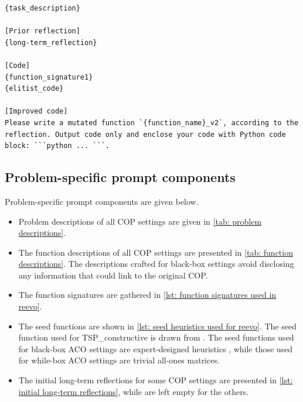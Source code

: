 \begin{lstlisting}[caption={User prompt for elitist mutation.},  label={lst: user prompt for elitist mutation}, style=promptstyle]
{task_description}

[Prior reflection]
{long-term_reflection}

[Code]
{function_signature1}
{elitist_code}

[Improved code]
Please write a mutated function `{function_name}_v2`, according to the reflection. Output code only and enclose your code with Python code block: ```python ... ```.
\end{lstlisting}

\subsection{Problem-specific prompt components}

Problem-specific prompt components are given below.
\begin{itemize}
    \item Problem descriptions of all COP settings are given in \cref{tab: problem descriptions}.
    \item The function descriptions of all COP settings are presented in \cref{tab: function descriptions}. The descriptions crafted for black-box settings avoid disclosing any information that could link to the original COP.
    \item The function signatures are gathered in \cref{lst: function signatures used in reevo}.
    \item The seed functions are shown in \cref{lst: seed heuristics used for reevo}. The seed function used for TSP\_constructive is drawn from \cite{liu2023algorithm_evolution}. The seed functions used for black-box ACO settings are expert-designed heuristics \cite{skinderowicz2022_aco_tsp_human_bl, cai2022_aco_cvrp_human_bl, sohrabi2021_aco_op_human_bl, fidanova2020_aco_mkp_human_bl, levine2004_aco_bpp_human_bl}, while those used for while-box ACO settings are trivial all-ones matrices.
    \item The initial long-term reflections for some COP settings are presented in \cref{lst: initial long-term reflections}, while are left empty for the others.
\end{itemize}


    
